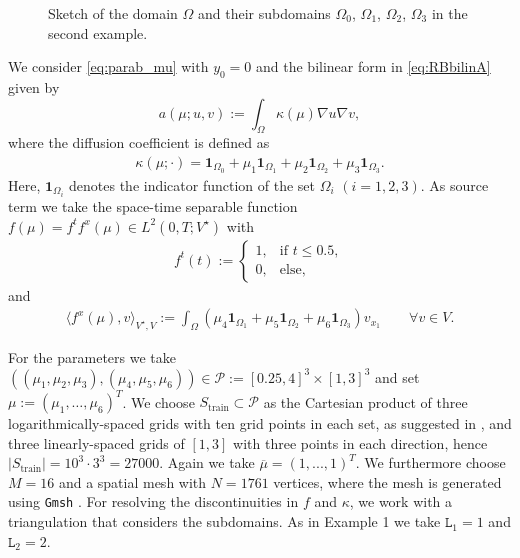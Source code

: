 \documentclass{article}
\theoremstyle{plain}
\theoremstyle{definition}
\theoremstyle{remark}
\begin{document}
\begin{figure}
    \caption{Sketch of the domain $\Omega$ and their subdomains $\Omega_0$, $\Omega_1$, $\Omega_2$, $\Omega_3$ in the second example.}
    \label{fig:sketchEX2}
\end{figure}
We consider \eqref{eq:parab_mu} with $y_0=0$ and the bilinear form in \eqref{eq:RBbilinA} given by
\[a(\mu;u,v):= \int_\Omega \kappa(\mu)\nabla u \nabla v,
\]
where the diffusion coefficient is defined as
\begin{align}
    \kappa(\mu;\cdot) = \mathbf{1}_{\Omega_0} + \mu_1\mathbf{1}_{\Omega_1} + \mu_2\mathbf{1}_{\Omega_2} + \mu_3\mathbf{1}_{\Omega_3}.
\end{align}
Here, $\mathbf{1}_{\Omega_i}$ denotes the indicator function of the set $\Omega_i$ $(i=1,2,3)$.
As source term we take the space-time separable function $f(\mu) = f^tf^x(\mu) \in L^2(0,T;V^\star)$ with
\begin{align*}
\label{eq:bsprechteseite0}
    f^t(t) := \begin{cases}1, & \text{if } t \leq 0.5, \\ 0, & \text{else},
    \end{cases}
\end{align*}
and
\begin{align*}
    \langle f^x(\mu), v \rangle_{V^\star, V} := \int_\Omega (\mu_4 \mathbf{1}_{\Omega_1} + \mu_5 \mathbf{1}_{\Omega_2} + \mu_6 \mathbf{1}_{\Omega_3})v_{x_{1}} \qquad \forall v \in V.
\end{align*}


For the parameters we take $((\mu_1,\mu_2,\mu_3),(\mu_4,\mu_5,\mu_6)) \in \mathcal{P}:= [0.25, 4]^3 \times [1,3]^3$ and set $\mu:= (\mu_1,\ldots,\mu_6)^T$.
%
We choose $S_{\text{train}} \subset \mathcal{P}$ as the Cartesian product of three logarithmically-spaced grids with ten grid points in each set, as suggested in \cites[§3.5.2]{RozzaRB}, and three linearly-spaced grids of $[1,3]$ with three points in each direction, hence $\vert S_{\text{train}} \vert = 10^3\cdot 3^3 = 27000$. Again we take $\overline{\mu} = (1,...,1)^T$. We furthermore choose $M = 16$ and a spatial mesh with $N = 1761$ vertices, where the mesh is generated using \texttt{Gmsh} \cite{Geuzaine2009-tj}. For resolving the discontinuities in $f$ and $\kappa$, we work with a triangulation that considers the subdomains. As in Example 1 we take $\texttt{L}_1 = 1$ and $\texttt{L}_2 = 2$.\\
\end{document}
